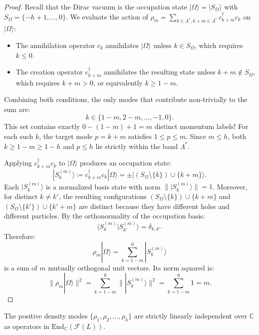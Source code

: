 \begin{proof}
Recall that the Dirac vacuum is the occupation state $|\Omega\rangle = |S_\Omega\rangle$ with $S_\Omega = \{-h+1, \dots, 0\}$.
We evaluate the action of $\rho_m = \sum_{k \in \Lambda^*, k+m \in \Lambda^*} c_{k+m}^\dagger c_k$ on $|\Omega\rangle$:
\begin{itemize}
    \item The annihilation operator $c_k$ annihilates $|\Omega\rangle$ unless $k \in S_\Omega$, which requires $k \le 0$.
    \item The creation operator $c_{k+m}^\dagger$ annihilates the resulting state unless $k+m \notin S_\Omega$, which requires $k+m > 0$, or equivalently $k \ge 1-m$.
\end{itemize}
Combining both conditions, the only modes that contribute non-trivially to the sum are:
\begin{equation}
k \in \{1 - m, 2 - m, \dots, -1, 0\}.
\end{equation}
This set contains exactly $0 - (1 - m) + 1 = m$ distinct momentum labels!
For each such $k$, the target mode $p = k + m$ satisfies $1 \le p \le m$. Since $m \le h$, both $k \ge 1-m \ge 1-h$ and $p \le h$ lie strictly within the band $\Lambda^*$.

Applying $c_{k+m}^\dagger c_k$ to $|\Omega\rangle$ produces an occupation state:
\[
|S_k^{(m)}\rangle \coloneqq c_{k+m}^\dagger c_k |\Omega\rangle = \pm |(S_\Omega \setminus \{k\}) \cup \{k+m\}\rangle.
\]
Each $|S_k^{(m)}\rangle$ is a normalized basis state with norm $\| |S_k^{(m)}\rangle \| = 1$.
Moreover, for distinct $k \neq k'$, the resulting configurations $(S_\Omega \setminus \{k\}) \cup \{k+m\}$ and $(S_\Omega \setminus \{k'\}) \cup \{k'+m\}$ are distinct because they have different holes and different particles.
By the orthonormality of the occupation basis:
\[
\langle S_k^{(m)} | S_{k'}^{(m)} \rangle = \delta_{k, k'}.
\]
Therefore:
\[
\rho_m |\Omega\rangle = \sum_{k=1-m}^0 |S_k^{(m)}\rangle
\]
is a sum of $m$ mutually orthogonal unit vectors. Its norm squared is:
\[
\| \rho_m |\Omega\rangle \|^2 = \sum_{k=1-m}^0 \| |S_k^{(m)}\rangle \|^2 = \sum_{k=1-m}^0 1 = m.
\]
\end{proof}

\begin{corollary}
The positive density modes $\{\rho_1, \rho_2, \dots, \rho_h\}$ are strictly linearly independent over $\mathbb{C}$ as operators in $\mathrm{End}_{\mathbb{C}}(\mathcal{F}(L))$.
\end{corollary}

